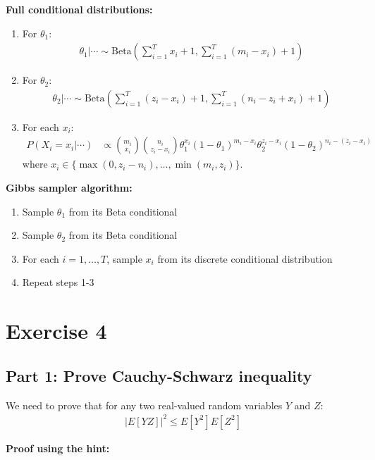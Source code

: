 \documentclass[11pt,a4paper]{article}
\begin{document}
\textbf{Full conditional distributions:}

\begin{enumerate}
\item For $\theta_1$:
\begin{align}
\theta_1 | \cdots \sim \text{Beta}\left(\sum_{i=1}^T x_i + 1, \sum_{i=1}^T (m_i - x_i) + 1\right)
\end{align}

\item For $\theta_2$:
\begin{align}
\theta_2 | \cdots \sim \text{Beta}\left(\sum_{i=1}^T (z_i - x_i) + 1, \sum_{i=1}^T (n_i - z_i + x_i) + 1\right)
\end{align}

\item For each $x_i$:
\begin{align}
P(X_i = x_i | \cdots) &\propto \binom{m_i}{x_i} \binom{n_i}{z_i-x_i} \theta_1^{x_i} (1-\theta_1)^{m_i-x_i} \theta_2^{z_i-x_i} (1-\theta_2)^{n_i-(z_i-x_i)}
\end{align}
where $x_i \in \{\max(0, z_i - n_i), \ldots, \min(m_i, z_i)\}$.
\end{enumerate}

\textbf{Gibbs sampler algorithm:}
\begin{enumerate}
\item Sample $\theta_1$ from its Beta conditional
\item Sample $\theta_2$ from its Beta conditional  
\item For each $i = 1, \ldots, T$, sample $x_i$ from its discrete conditional distribution
\item Repeat steps 1-3
\end{enumerate}

\section{Exercise 4}

\subsection{Part 1: Prove Cauchy-Schwarz inequality}

We need to prove that for any two real-valued random variables $Y$ and $Z$:
\begin{align}
|E[YZ]|^2 \leq E[Y^2]E[Z^2]
\end{align}

\textbf{Proof using the hint:}
\end{document}
